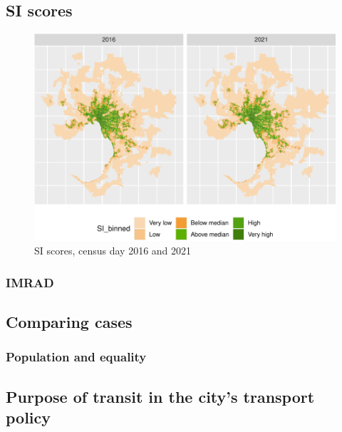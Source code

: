 \documentclass[preprint, 3p,
authoryear]{elsarticle} %
\begin{document}
\hypertarget{si-scores}{%
\subsection{SI scores}\label{si-scores}}

\begin{figure}
\centering
\includegraphics{Leveraging_GTFS_to_assess_transit_supply_Transport_Geography_files/figure-latex/Greater_Melbourne_2016_2021-1.pdf}
\caption{SI scores, census day 2016 and 2021}
\end{figure}

\hypertarget{imrad}{%
\subsubsection{IMRAD}\label{imrad}}

\hypertarget{comparing-cases}{%
\subsection{Comparing cases}\label{comparing-cases}}

\hypertarget{population-and-equality}{%
\subsubsection{Population and equality}\label{population-and-equality}}

\hypertarget{purpose-of-transit-in-the-citys-transport-policy}{%
\subsection{Purpose of transit in the city's transport
policy}\label{purpose-of-transit-in-the-citys-transport-policy}}
\end{document}
